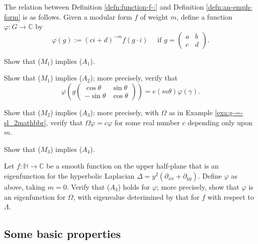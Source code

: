 \documentclass[reqno]{amsart} 
\begin{document}
The relation between Definition \ref{defn:function-f-:} and Definition \ref{defn:an-emph-form} is as follows.  Given a modular form $f$ of weight $m$, define a function $\varphi : G \rightarrow \mathbb{C} $ by
\begin{equation*}
  \varphi (g) := (c i + d)^{-m} f (g \cdot i) \quad \text{ if } g = 
  \begin{pmatrix}
    a & b \\
    c & d
  \end{pmatrix}
  .
\end{equation*}
\begin{exercise}
  Show that ($M_1$) implies ($A_1$).
\end{exercise}
\begin{exercise}
  Show that ($M_1$) implies ($A_2$); more precisely, verify that
  \begin{equation*}
    \varphi \left( g 
      \begin{pmatrix}
        \cos \theta  & \sin \theta  \\
        -\sin \theta & \cos \theta
      \end{pmatrix}
    \right) = e (m \theta ) \varphi (\gamma).
  \end{equation*}
\end{exercise}
\begin{exercise}
  Show that ($M_2$) implies ($A_3$); more precisely, with $\Omega$ as in Example \ref{exa:g-=-sl_2mathbbr}, verify that $\Omega \varphi = c \varphi$ for some real number $c$ depending only upon $m$.
\end{exercise}
\begin{exercise}
  Show that ($M_3$) implies ($A_4$).
\end{exercise}

\begin{exercise}\label{exe:let-f-:}
  Let $f : \mathbb{H} \rightarrow \mathbb{C}$ be a smooth function on the upper half-plane that is an eigenfunction for the hyperbolic Laplacian $\Delta = y^2 (\partial_{x x} + \partial_{y y})$.  Define $\varphi$ as above, taking $m = 0$.  Verify that ($A_3$) holds for $\varphi$; more precisely, show that $\varphi$ is an eigenfunction for $\Omega$, with eigenvalue deterimined by that for $f$ with respect to $\Lambda$.
\end{exercise}

\subsection{Some basic properties}
\end{document}
